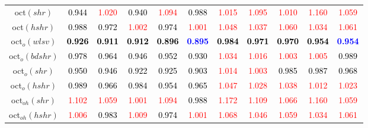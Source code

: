 \begin{tabular}[t]{c|>{}cccc>{}c|ccccc}
oct$(shr)$ & \textcolor{black}{0.944} & \textcolor{red}{1.020} & \textcolor{black}{0.940} & \textcolor{red}{1.094} & \textcolor{black}{0.988} & \textcolor{red}{1.015} & \textcolor{red}{1.095} & \textcolor{red}{1.010} & \textcolor{red}{1.160} & \textcolor{red}{1.059}\\
oct$(hshr)$ & \textcolor{black}{0.988} & \textcolor{black}{0.972} & \textcolor{red}{1.002} & \textcolor{black}{0.974} & \textcolor{red}{1.001} & \textcolor{red}{1.048} & \textcolor{red}{1.037} & \textcolor{red}{1.060} & \textcolor{red}{1.034} & \textcolor{red}{1.061}\\
oct$_o(wlsv)$ & \textcolor{black}{\textbf{0.926}} & \textcolor{black}{\textbf{0.911}} & \textcolor{black}{\textbf{0.912}} & \textcolor{black}{\textbf{0.896}} & \textcolor{blue}{\textbf{0.895}} & \textcolor{black}{\textbf{0.984}} & \textcolor{black}{\textbf{0.971}} & \textcolor{black}{\textbf{0.970}} & \textcolor{black}{\textbf{0.954}} & \textcolor{blue}{\textbf{0.954}}\\
oct$_o(bdshr)$ & \textcolor{black}{0.978} & \textcolor{black}{0.964} & \textcolor{black}{0.946} & \textcolor{black}{0.952} & \textcolor{black}{0.930} & \textcolor{red}{1.034} & \textcolor{red}{1.016} & \textcolor{red}{1.003} & \textcolor{red}{1.005} & \textcolor{black}{0.989}\\
oct$_o(shr)$ & \textcolor{black}{0.950} & \textcolor{black}{0.946} & \textcolor{black}{0.922} & \textcolor{black}{0.925} & \textcolor{black}{0.903} & \textcolor{red}{1.014} & \textcolor{red}{1.003} & \textcolor{black}{0.985} & \textcolor{black}{0.987} & \textcolor{black}{0.968}\\
oct$_o(hshr)$ & \textcolor{black}{0.989} & \textcolor{black}{0.966} & \textcolor{black}{0.984} & \textcolor{black}{0.954} & \textcolor{black}{0.965} & \textcolor{red}{1.047} & \textcolor{red}{1.028} & \textcolor{red}{1.038} & \textcolor{red}{1.012} & \textcolor{red}{1.023}\\
oct$_{oh}(shr)$ & \textcolor{red}{1.102} & \textcolor{red}{1.059} & \textcolor{red}{1.001} & \textcolor{red}{1.094} & \textcolor{black}{0.988} & \textcolor{red}{1.172} & \textcolor{red}{1.109} & \textcolor{red}{1.066} & \textcolor{red}{1.160} & \textcolor{red}{1.059}\\
oct$_{oh}(hshr)$ & \textcolor{red}{1.006} & \textcolor{black}{0.983} & \textcolor{red}{1.009} & \textcolor{black}{0.974} & \textcolor{red}{1.001} & \textcolor{red}{1.068} & \textcolor{red}{1.046} & \textcolor{red}{1.059} & \textcolor{red}{1.034} & \textcolor{red}{1.061}\\

\end{tabular}
